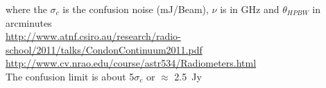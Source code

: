 where the $\sigma_{c}$ is the confusion noise (mJ/Beam), $\nu$ is in GHz and $\theta_{HPBW}$ in arcminutes\\
\url{http://www.atnf.csiro.au/research/radio-school/2011/talks/CondonContinuum2011.pdf}\\
\url{http://www.cv.nrao.edu/course/astr534/Radiometers.html}\\


The confusion limit is about 5$\sigma_{c}$ or $\approx$ 2.5~Jy

